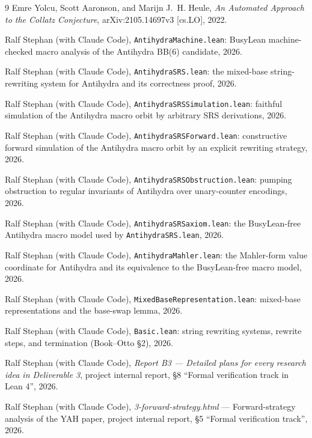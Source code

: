 \documentclass[11pt,a4paper]{article}
\theoremstyle{definition}
\begin{document}
\begin{thebibliography}{9}
Emre Yolcu, Scott Aaronson, and Marijn J.~H. Heule,
\textit{An Automated Approach to the Collatz Conjecture},
arXiv:2105.14697v3 [cs.LO], 2022.

Ralf Stephan (with Claude Code), \texttt{AntihydraMachine.lean}: BusyLean
machine-checked macro analysis of the Antihydra BB(6) candidate, 2026.

Ralf Stephan (with Claude Code), \texttt{AntihydraSRS.lean}: the
mixed-base string-rewriting system for Antihydra and its correctness
proof, 2026.

Ralf Stephan (with Claude Code), \texttt{AntihydraSRSSimulation.lean}:
faithful simulation of the Antihydra macro orbit by arbitrary SRS
derivations, 2026.

Ralf Stephan (with Claude Code), \texttt{AntihydraSRSForward.lean}:
constructive forward simulation of the Antihydra macro orbit by an
explicit rewriting strategy, 2026.

Ralf Stephan (with Claude Code), \texttt{AntihydraSRSObstruction.lean}:
pumping obstruction to regular invariants of Antihydra over
unary-counter encodings, 2026.

Ralf Stephan (with Claude Code), \texttt{AntihydraSRSaxiom.lean}: the
BusyLean-free Antihydra macro model used by \texttt{AntihydraSRS.lean},
2026.

Ralf Stephan (with Claude Code), \texttt{AntihydraMahler.lean}: the
Mahler-form value coordinate for Antihydra and its equivalence to the
BusyLean-free macro model, 2026.

Ralf Stephan (with Claude Code), \texttt{MixedBaseRepresentation.lean}:
mixed-base representations and the base-swap lemma, 2026.

Ralf Stephan (with Claude Code), \texttt{Basic.lean}: string rewriting
systems, rewrite steps, and termination (Book--Otto \S2), 2026.

Ralf Stephan (with Claude Code), \textit{Report B3 --- Detailed plans
for every research idea in Deliverable 3}, project internal report,
\S8 ``Formal verification track in Lean 4'', 2026.

Ralf Stephan (with Claude Code), \textit{3-forward-strategy.html} ---
Forward-strategy analysis of the YAH paper, project internal report,
\S5 ``Formal verification track'', 2026.
\end{thebibliography}
\end{document}
